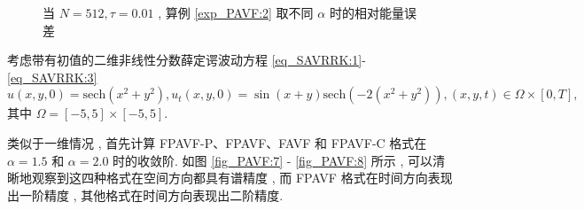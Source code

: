 	\begin{figure}[H]
	\begin{center}
	   
	\caption{当 $N = 512 , \tau=0.01$ , 算例 \ref{exp_PAVF:2} 取不同 $\alpha$ 时的相对能量误差}\label{fig_PAVF:6}
	\end{center}
	\end{figure}
	\begin{example}\label{exp_PAVF:4}
		考虑带有初值的二维非线性分数薛定谔波动方程 \eqref{eq_SAVRRK:1}-\eqref{eq_SAVRRK:3}
		\begin{equation}\label{eq_PAVF_110}
		u(x , y , 0)=\mbox{sech}\left(x^2+y^2\right) , u_t(x , y , 0)=\sin (x+y) \mbox{sech}\left(-2(x^2+y^2)\right) , (x , y , t)\in  \Omega\times[0 , T] , 
		\end{equation}
		其中 $\Omega=[-5 , 5] \times[-5 , 5]$.
		\end{example}

	类似于一维情况 , 首先计算 FPAVF-P、FPAVF、FAVF 和 FPAVF-C 格式在 $\alpha=1.5$ 和 $\alpha=2.0$ 时的收敛阶.
	如图 \ref{fig_PAVF:7} - \ref{fig_PAVF:8} 所示 , 可以清晰地观察到这四种格式在空间方向都具有谱精度 , 而 FPAVF 格式在时间方向表现出一阶精度 , 其他格式在时间方向表现出二阶精度.

